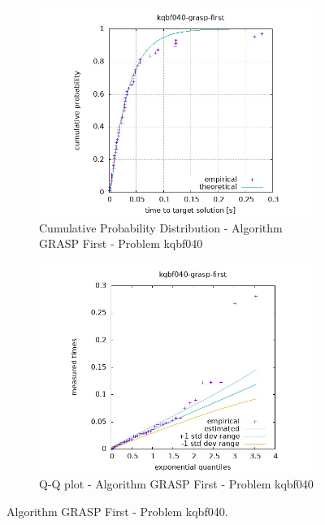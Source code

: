 \begin{figure}[H]
    \centering
    \begin{subfigure}{0.49\textwidth}
        \includegraphics[width=\textwidth]{figure/ttt_plot/kqbf040-grasp-first-exp.jpeg}
        \caption{Cumulative Probability Distribution - Algorithm GRASP First - Problem kqbf040}
        \label{fig:grasp-first-kqbf040-exp}
    \end{subfigure}
    \hfill
    \begin{subfigure}{0.49\textwidth}
        \includegraphics[width=\textwidth]{figure/ttt_plot/kqbf040-grasp-first-qq.jpeg}
        \caption{Q-Q plot - Algorithm GRASP First - Problem kqbf040}
        \label{fig:grasp-first-kqbf040-qq}
    \end{subfigure}
    \caption{Algorithm GRASP First - Problem kqbf040.}
    \label{fig:grasp-first-kqbf040}
\end{figure}


